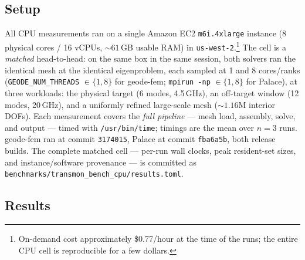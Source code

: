 \documentclass{anvil-paper}
\begin{document}
\subsection{Setup}

All CPU measurements ran on a single Amazon EC2 \texttt{m6i.4xlarge}
instance (8 physical cores / 16 vCPUs, ${\sim}61$\,GB usable RAM) in
\texttt{us-west-2}.\footnote{On-demand cost approximately \$0.77/hour at
the time of the runs; the entire CPU cell is reproducible for a few
dollars.} The cell is a \emph{matched} head-to-head: on the same box in
the same session, both solvers ran the identical mesh at the identical
eigenproblem, each sampled at 1 and 8 cores/ranks
(\texttt{GEODE\_NUM\_THREADS} $\in \{1, 8\}$ for geode-fem;
\texttt{mpirun -np} $\in \{1, 8\}$ for Palace), at three workloads: the
physical target (6 modes, 4.5\,GHz), an off-target window (12 modes,
20\,GHz), and a uniformly refined large-scale mesh (${\sim}1.16$M interior
DOFs). Each measurement covers the \emph{full pipeline} --- mesh load,
assembly, solve, and output --- timed with \texttt{/usr/bin/time};
timings are the mean over $n = 3$ runs. geode-fem ran at commit
\texttt{3174015}, Palace at commit \texttt{fba6a5b}, both release builds.
The complete matched cell --- per-run wall clocks, peak resident-set
sizes, and instance/software provenance --- is committed as
\texttt{benchmarks/transmon\_bench\_cpu/results.toml}.

\subsection{Results}
\end{document}
